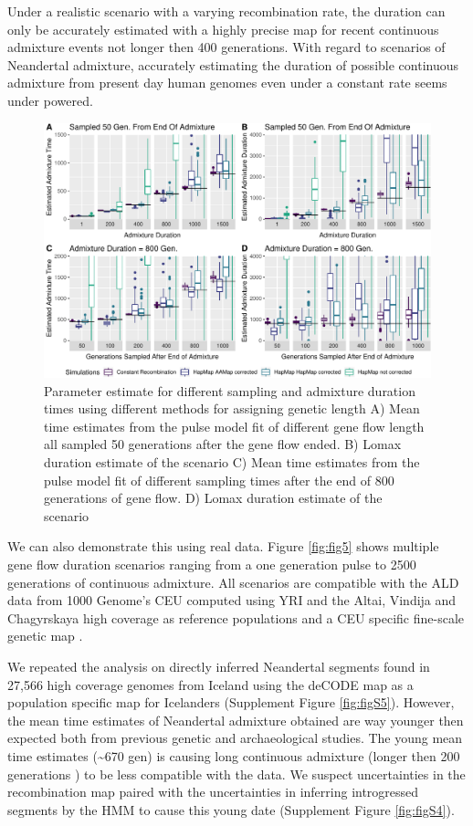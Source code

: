\documentclass[]{article}
\begin{document}
Under a realistic scenario with a varying recombination
rate, the duration can only be accurately estimated with a highly
precise map for recent continuous admixture events not longer then 400
generations. With regard to scenarios of Neandertal admixture,
accurately estimating the duration of possible continuous admixture from
present day human genomes even under a constant rate seems
under powered. 


\begin{figure}
\centering
\includegraphics{Admixture_Time_Inference_Paper_Draft_files/figure-latex/fig4-1.pdf}
\caption{\label{fig:fig4} Parameter estimate for different sampling and
admixture duration times using different methods for assigning genetic
length A) Mean time estimates from the pulse model fit of different gene
flow length all sampled 50 generations after the gene flow ended. B)
Lomax duration estimate of the scenario C) Mean time estimates from the
pulse model fit of different sampling times after the end of 800
generations of gene flow. D) Lomax duration estimate of the scenario}
\end{figure}


We can also demonstrate this using real data.
Figure \ref{fig:fig5} shows multiple gene flow duration scenarios ranging from a one generation pulse to 2500 generations of continuous admixture. All scenarios are compatible with the ALD data from 1000 Genome's CEU computed using YRI and the Altai, Vindija and Chagyrskaya high coverage as reference populations and a CEU specific fine-scale genetic map \cite{spence_inference_2019}.

We repeated the analysis on directly inferred Neandertal segments found in 27,566 high coverage genomes from Iceland \cite{skov_nature_2020} using the deCODE map \cite{kong_fine-scale_2010} as a population specific map for Icelanders (Supplement Figure \ref{fig:figS5}). However, the mean time estimates of Neandertal admixture obtained are way younger then expected both from previous genetic and archaeological studies. The young mean time estimates (\textasciitilde{}670 gen) is causing long continuous admixture (longer then 200 generations ) to be less compatible with the data. We suspect uncertainties in the recombination map paired with the uncertainties in inferring introgressed segments by the HMM to cause this young date (Supplement Figure \ref{fig:figS4}).
\end{document}
